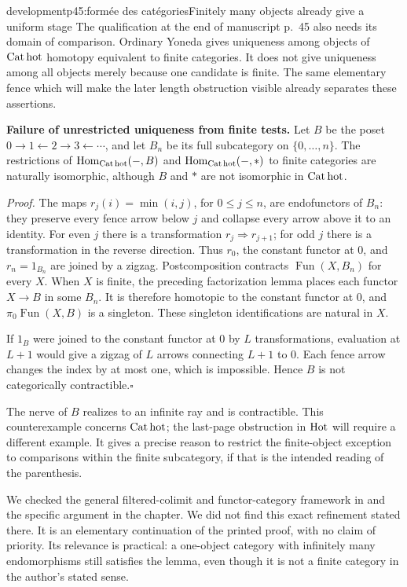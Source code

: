 \begin{dcomment}{development}{p45:formée des catégories}{Finitely many objects already give a uniform stage}
The qualification at the end of manuscript p.~45 also needs its domain of comparison. Ordinary Yoneda gives uniqueness among objects of $\mathrm{Cat\,hot}$ homotopy equivalent to finite categories. It does not give uniqueness among all objects merely because one candidate is finite. The same elementary fence which will make the later length obstruction visible already separates these assertions.

\textbf{Failure of unrestricted uniqueness from finite tests.}\ours\quad
Let $B$ be the poset $0\to1\leftarrow2\to3\leftarrow\cdots$, and let $B_n$ be its full subcategory on $\{0,\ldots,n\}$. The restrictions of $\operatorname{Hom}_{\mathrm{Cat\,hot}}(-,B)$ and $\operatorname{Hom}_{\mathrm{Cat\,hot}}(-,*)$ to finite categories are naturally isomorphic, although $B$ and $*$ are not isomorphic in $\mathrm{Cat\,hot}$.

\textit{Proof.} The maps $r_j(i)=\min(i,j)$, for $0\leq j\leq n$, are endofunctors of $B_n$: they preserve every fence arrow below $j$ and collapse every arrow above it to an identity. For even $j$ there is a transformation $r_j\Rightarrow r_{j+1}$; for odd $j$ there is a transformation in the reverse direction. Thus $r_0$, the constant functor at $0$, and $r_n=1_{B_n}$ are joined by a zigzag. Postcomposition contracts $\operatorname{Fun}(X,B_n)$ for every $X$. When $X$ is finite, the preceding factorization lemma places each functor $X\to B$ in some $B_n$. It is therefore homotopic to the constant functor at $0$, and $\pi_0\operatorname{Fun}(X,B)$ is a singleton. These singleton identifications are natural in $X$.

If $1_B$ were joined to the constant functor at $0$ by $L$ transformations, evaluation at $L+1$ would give a zigzag of $L$ arrows connecting $L+1$ to $0$. Each fence arrow changes the index by at most one, which is impossible. Hence $B$ is not categorically contractible.\hfill$\square$

The nerve of $B$ realizes to an infinite ray and is contractible. This counterexample concerns $\mathrm{Cat\,hot}$; the last-page obstruction in $\mathrm{Hot}$ will require a different example. It gives a precise reason to restrict the finite-object exception to comparisons within the finite subcategory, if that is the intended reading of the parenthesis.

We checked the general filtered-colimit and functor-category framework in \citet[Chapters~1 and 7]{Riehl2014} and the specific argument in the chapter. We did not find this exact refinement stated there. It is an elementary continuation of the printed proof, with no claim of priority. Its relevance is practical: a one-object category with infinitely many endomorphisms still satisfies the lemma, even though it is not a finite category in the author's stated sense.
\end{dcomment}


